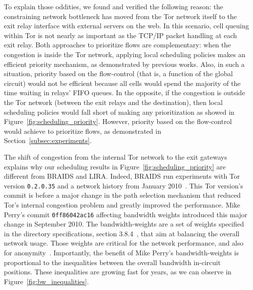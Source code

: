 To explain those oddities, we found and verified the following reason: the constraining network bottleneck has moved from the Tor network itself to the exit relay interface with external servers on the web.
In this scenario, cell queuing within Tor is not nearly as important as the TCP/IP packet handling at each exit relay.
Both approaches to prioritize flows are complementary: when the congestion is inside the Tor network, applying local scheduling policies makes an efficient priority mechanism, as demonstrated by previous works.
Also, in such a situation, priority based on the flow-control (that is, a function of the global circuit) would not be efficient because all cells would spend the majority of the time waiting in relays' FIFO queues.
In the opposite, if the congestion is outside the Tor network (between the exit relays and the destination), then local scheduling policies would fall short of making any prioritization as showed in Figure~\ref{fig:scheduling_priority}.
However, priority based on the flow-control would achieve to prioritize flows, as demonstrated in Section~\ref{subsec:experiments}.

The shift of congestion from the internal Tor network to the exit gateways explains why our scheduling results in Figure~\ref{fig:scheduling_priority} are different from BRAIDS and LIRA.
Indeed, BRAIDS run experiments with Tor version \texttt{0.2.0.35} and a network history from January 2010~\cite{braids-repository}.
This Tor version's commit is before a major change in the path selection mechanism that reduced Tor's internal congestion problem and greatly improved the performance.
Mike Perry's commit \texttt{0ff86042ac16} affecting bandwidth weights introduced this major change in September 2010.
The bandwidth-weights are a set of weights specified in the directory specifications, section 3.8.4~\cite{dirspec}, that aim at balancing the overall network usage.
Those weights are critical for the network performance, and also for anonymity~\cite{waterfilling-pets2017, wf_proposal}.
Importantly, the benefit of Mike Perry's bandwidth-weights is proportional to the inequalities between the overall bandwidth in-circuit positions.
These inequalities are growing fast for years, as we can observe in Figure~\ref{fig:bw_inequalities}.

